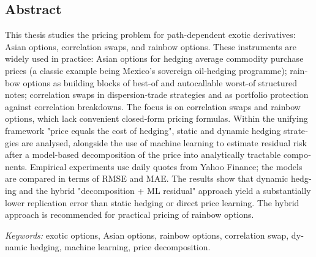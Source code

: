 \begin{otherlanguage}{english}
\section*{Abstract}

This thesis studies the pricing problem for
 path-dependent exotic derivatives: Asian
 options, correlation swaps, and rainbow options. These 
 instruments are widely used in practice: Asian options 
 for hedging average commodity purchase prices (a classic
  example being Mexico's sovereign oil-hedging programme); 
  rainbow options as building blocks of best-of and
   autocallable worst-of structured notes; correlation swaps 
   in dispersion-trade strategies and as portfolio protection 
   against correlation breakdowns. The focus is on correlation 
   swaps and rainbow options, which lack convenient 
closed-form pricing formulas. Within the unifying framework
 "price equals the cost of hedging", static and dynamic 
 hedging strategies are analysed, alongside the use of
  machine learning to estimate residual risk after a 
  model-based decomposition of the price into analytically 
  tractable components. Empirical experiments use daily quotes from 
  Yahoo Finance; the models are compared in terms of RMSE and MAE. 
  The results show that dynamic hedging and the hybrid "decomposition 
  + ML residual" approach yield a substantially lower
   replication error than static hedging or direct price 
   learning. The hybrid approach is recommended for practical
    pricing of rainbow options.

\par\medskip
\noindent\textit{Keywords:} exotic options, Asian options, rainbow
options, correlation swap, dynamic hedging, machine learning,
price decomposition.
\end{otherlanguage}

\newpage
